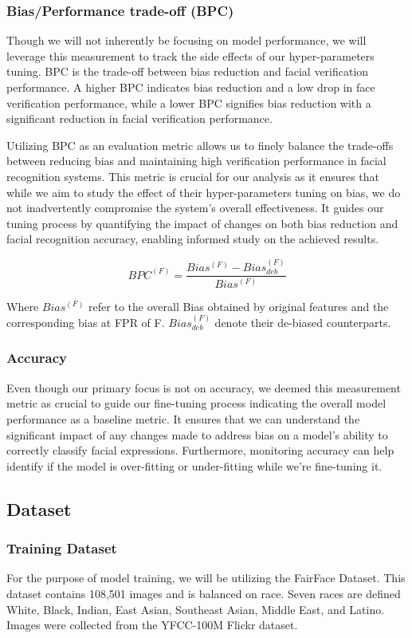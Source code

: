 \documentclass[conference]{IEEEtran}
\begin{document}
\subsubsection{Bias/Performance trade-off (BPC)}
Though we will not inherently be focusing on model performance, we will leverage this measurement to track the side effects of our hyper-parameters tuning. BPC is the trade-off between bias reduction and facial verification performance. A higher BPC indicates bias reduction and a low drop in face verification performance, while a lower BPC signifies bias reduction with a significant reduction in facial verification performance.

Utilizing BPC as an evaluation metric allows us to finely balance the trade-offs between reducing bias and maintaining high verification performance in facial recognition systems. This metric is crucial for our analysis as it ensures that while we aim to study the effect of their hyper-parameters tuning on bias, we do not inadvertently compromise the system's overall effectiveness. It guides our tuning process by quantifying the impact of changes on both bias reduction and facial recognition accuracy, enabling informed study on the achieved results.

\begin{equation}
    {BPC^{(F)}=\frac{Bias^{(F)}-Bias_{deb}^{(F)}}{Bias^{(F)}}}
\end{equation}

Where $Bias^{(F)}$ refer to the overall Bias obtained by original features and the corresponding bias at FPR of F. $Bias_{deb}^{(F)}$ denote their de-biased counterparts. 

\subsubsection{Accuracy}
Even though our primary focus is not on accuracy, we deemed this measurement metric as crucial to guide our fine-tuning process indicating the overall model performance as a baseline metric. It ensures that we can understand the significant impact of any changes made to address bias on a model's ability to correctly classify facial expressions.
Furthermore, monitoring accuracy can help identify if the model is over-fitting or under-fitting while we’re fine-tuning it.

\subsection{Dataset}
\subsubsection{Training Dataset}
For the purpose of model training, we will be utilizing the FairFace Dataset\cite{karkkainen2021fairface}. This dataset contains 108,501 images and is balanced on race. Seven races are defined White, Black, Indian, East Asian, Southeast Asian, Middle East, and Latino. Images were collected from the YFCC-100M Flickr dataset\cite{thomee2016yfcc100m}.
\end{document}
